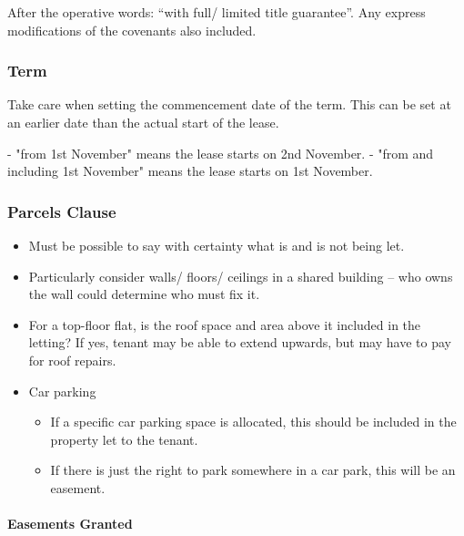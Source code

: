 \documentclass[
]{article}
\newenvironment{Shaded}{}{}
\newcommand{\NormalTok}[1]{#1}
\providecommand{\tightlist}{%
  \setlength{\itemsep}{0pt}\setlength{\parskip}{0pt}}
\begin{document}
After the operative words: ``with full/ limited title guarantee''. Any
express modifications of the covenants also included.

\hypertarget{term}{%
\subsubsection{Term}\label{term}}

Take care when setting the commencement date of the term. This can be
set at an earlier date than the actual start of the lease.

\begin{Shaded}
\begin{Highlighting}[]
\NormalTok{{-} "from 1st November" means the lease starts on 2nd November. }
\NormalTok{{-} "from and including 1st November" means the lease starts on 1st November. }
\end{Highlighting}
\end{Shaded}

\hypertarget{parcels-clause}{%
\subsubsection{Parcels Clause}\label{parcels-clause}}

\begin{itemize}
\tightlist
\item
  Must be possible to say with certainty what is and is not being let.
\item
  Particularly consider walls/ floors/ ceilings in a shared building --
  who owns the wall could determine who must fix it.
\item
  For a top-floor flat, is the roof space and area above it included in
  the letting? If yes, tenant may be able to extend upwards, but may
  have to pay for roof repairs.
\item
  Car parking

  \begin{itemize}
  \tightlist
  \item
    If a specific car parking space is allocated, this should be
    included in the property let to the tenant.
  \item
    If there is just the right to park somewhere in a car park, this
    will be an easement.
  \end{itemize}
\end{itemize}

\hypertarget{easements-granted}{%
\paragraph{Easements Granted}\label{easements-granted}}
\end{document}
